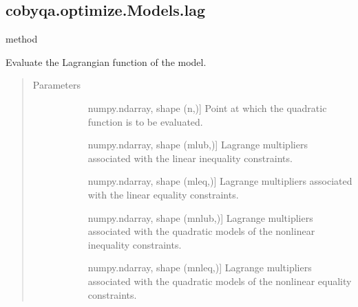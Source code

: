 \documentclass[letterpaper,10pt,english]{sphinxmanual}
\begin{document}
\begin{fulllineitems}
\subsection{cobyqa.optimize.Models.lag}
\label{\detokenize{refs/generated/cobyqa.optimize.Models.lag:cobyqa-optimize-models-lag}}\label{\detokenize{refs/generated/cobyqa.optimize.Models.lag::doc}}
\sphinxAtStartPar
method

\begin{fulllineitems}
\label{\detokenize{refs/generated/cobyqa.optimize.Models.lag:cobyqa.optimize.Models.lag}}
\sphinxAtStartPar
Evaluate the Lagrangian function of the model.
\begin{quote}\begin{description}
\item[{Parameters}] \leavevmode\begin{description}
\item[{}] \leavevmode{[}numpy.ndarray, shape (n,){]}
\sphinxAtStartPar
Point at which the quadratic function is to be evaluated.

\item[{}] \leavevmode{[}numpy.ndarray, shape (mlub,){]}
\sphinxAtStartPar
Lagrange multipliers associated with the linear inequality
constraints.

\item[{}] \leavevmode{[}numpy.ndarray, shape (mleq,){]}
\sphinxAtStartPar
Lagrange multipliers associated with the linear equality
constraints.

\item[{}] \leavevmode{[}numpy.ndarray, shape (mnlub,){]}
\sphinxAtStartPar
Lagrange multipliers associated with the quadratic models of the
nonlinear inequality constraints.

\item[{}] \leavevmode{[}numpy.ndarray, shape (mnleq,){]}
\sphinxAtStartPar
Lagrange multipliers associated with the quadratic models of the
nonlinear equality constraints.

\end{description}


\end{description}
\end{quote}
\end{fulllineitems}
\end{fulllineitems}
\end{document}
